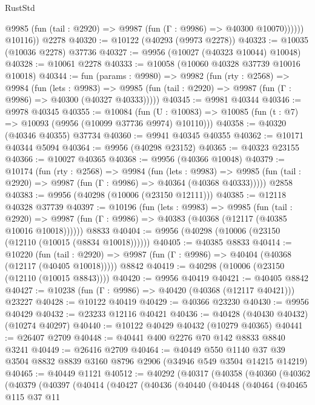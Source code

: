 \begin{lexlean}{RustStd}
\begin{coremodule}
              @9985 (fun (tail : @2920) => @9987 (fun (Γ : @9986) => @40300 @10070))))))
        @10116))
    @2278
@40320 := @10122 (@40293 (@9973 @2278))
@40323 := @10035 (@10036 @2278) @37736
@40327 := @9956 (@10027 (@40323 @10044) @10048)
@40328 := @10061 @2278
@40333 := @10058 (@10060 @40328 @37739 @10016 @10018)
@40344 := fun (params : @9980) =>
  @9982
    (fun (rty : @2568) =>
    @9984
      (fun (lets : @9983) =>
      @9985 (fun (tail : @2920) => @9987 (fun (Γ : @9986) => @40300 (@40327 @40333)))))
@40345 := @9981 @40344
@40346 := @9978 @40345
@40355 := @10084
    (fun (U : @10083) => @10085 (fun (t : @7) => @10093 (@9956 (@10099 @37736 @9974) @10110)))
@40358 := @40320 (@40346 @40355) @37734
@40360 := @9941 @40345 @40355
@40362 := @10171 @40344 @5094
@40364 := @9956 (@40298 @23152)
@40365 := @40323 @23155
@40366 := @10027 @40365
@40368 := @9956 (@40366 @10048)
@40379 := @10174
    (fun (rty : @2568) =>
    @9984
      (fun (lets : @9983) =>
      @9985 (fun (tail : @2920) => @9987 (fun (Γ : @9986) => @40364 (@40368 @40333)))))
    @2858
@40383 := @9956 (@40298 (@10006 (@23150 @12111)))
@40385 := @12118 @40328 @37739
@40397 := @10196
    (fun (lets : @9983) =>
    @9985
      (fun (tail : @2920) =>
      @9987 (fun (Γ : @9986) => @40383 (@40368 (@12117 (@40385 @10016 @10018))))))
    @8833
@40404 := @9956 (@40298 (@10006 (@23150 (@12110 (@10015 (@8834 @10018))))))
@40405 := @40385 @8833
@40414 := @10220
    (fun (tail : @2920) => @9987 (fun (Γ : @9986) => @40404 (@40368 (@12117 (@40405 @10018)))))
    @8842
@40419 := @40298 (@10006 (@23150 (@12110 (@10015 @8843))))
@40420 := @9956 @40419
@40421 := @40405 @8842
@40427 := @10238 (fun (Γ : @9986) => @40420 (@40368 (@12117 @40421))) @23227
@40428 := @10122 @40419
@40429 := @40366 @23230
@40430 := @9956 @40429
@40432 := @23233 @12116 @40421
@40436 := @40428 (@40430 @40432) (@10274 @40297)
@40440 := @10122 @40429 @40432 (@10279 @40365)
@40441 := @26407 @2709
@40448 := @40441 @400 @2276 @70 @142 @8833 @8840 @3241
@40449 := @26416 @2709
@40464 := @40449
    @550
    @1140
    @37
    @39
    @3504
    @8832
    @8839
    @3160
    @8796
    @2906
    (@34946 @549 @3504 @14215 @14219)
@40465 := @40449 @1121
@40512 := @40292
    (@40317
      (@40358
        (@40360
          (@40362
            (@40379
              (@40397
                (@40414
                  (@40427
                    (@40436
                      (@40440
                        (@40448
                          (@40464
                            (@40465
                              @115
                              @37
                              @11

\end{coremodule}
\end{lexlean}
